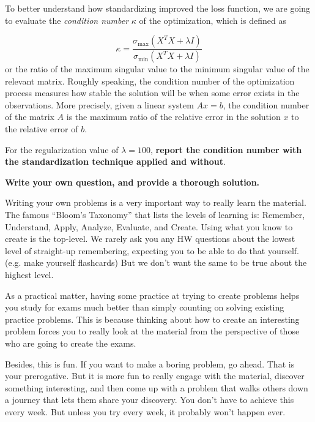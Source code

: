 \documentclass[preview]{standalone}
\begin{document}
\begin{Parts}
\Part To better understand how standardizing improved the loss function, we are going to evaluate the \emph{condition number} $\kappa$ of the optimization, which is defined as

$$\kappa = \frac{\sigma_{\mbox{max}}(X^TX+\lambda I)}{\sigma_{\mbox{min}}(X^TX+\lambda I)}$$
or the ratio of the maximum singular value to the minimum singular value of the relevant matrix. Roughly speaking, the condition number of the optimization process measures how stable the solution will be when some error exists in the observations. More precisely, given a linear system $Ax=b$, the condition number of the matrix $A$ is the maximum ratio of the relative error in the solution $x$ to the relative error of $b$.

For the regularization value of $\lambda = 100$, {\bf report the condition number with the standardization technique applied and without}. 














\end{Parts}


{\bf Write your own question, and provide a thorough solution.}

Writing your own problems is a very important way to really learn
the material. The famous ``Bloom's Taxonomy'' that lists the levels of
learning is: Remember, Understand, Apply, Analyze, Evaluate, and
Create. Using what you know to create is the top-level. We rarely ask
you any HW questions about the lowest level of straight-up
remembering, expecting you to be able to do that yourself. (e.g. make
yourself flashcards) But we don't want the same to be true about the
highest level.

As a practical matter, having some practice at trying to create
problems helps you study for exams much better than simply counting on
solving existing practice problems. This is because thinking about how
to create an interesting problem forces you to really look at the
material from the perspective of those who are going to create the
exams. 

Besides, this is fun. If you want to make a boring problem, go
ahead. That is your prerogative. But it is more fun to really engage
with the material, discover something interesting, and then come up
with a problem that walks others down a journey that lets them share
your discovery. You don't have to achieve this every week. But unless
you try every week, it probably won't happen ever. 
\end{document}
